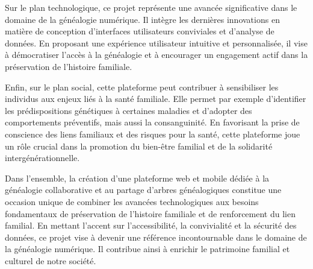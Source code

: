 Sur le plan technologique, ce projet représente une avancée significative dans le
domaine de la généalogie numérique. Il intègre les dernières innovations en
matière de conception d’interfaces utilisateurs conviviales et d’analyse de données.
En proposant une expérience utilisateur intuitive et personnalisée, il vise à
démocratiser l’accès à la généalogie et à encourager un engagement actif dans
la préservation de l’histoire familiale.

Enfin, sur le plan social, cette plateforme peut contribuer à sensibiliser les
individus aux enjeux liés à la santé familiale. Elle permet par exemple d’identifier
les prédispositions génétiques à certaines maladies et d’adopter des comportements
préventifs, mais aussi la consanguinité. En favorisant la prise de conscience des
liens familiaux et des risques pour la santé, cette plateforme joue un rôle crucial
dans la promotion du bien-être familial et de la solidarité intergénérationnelle.

Dans l’ensemble, la création d’une plateforme web et mobile dédiée à la généalogie
collaborative et au partage d’arbres généalogiques constitue une occasion unique
de combiner les avancées technologiques aux besoins fondamentaux de préservation
de l’histoire familiale et de renforcement du lien familial. En mettant l’accent
sur l’accessibilité, la convivialité et la sécurité des données, ce projet vise à
devenir une référence incontournable dans le domaine de la généalogie numérique.
Il contribue ainsi à enrichir le patrimoine familial et culturel de notre société.

